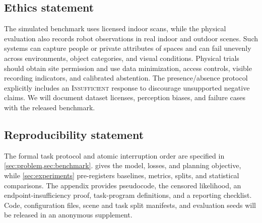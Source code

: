 \documentclass{article}
\begin{document}
\subsection*{Ethics statement}
The simulated benchmark uses licensed indoor scans, while the physical evaluation also records robot observations in real indoor and outdoor scenes.
Such systems can capture people or private attributes of spaces and can fail unevenly across environments, object categories, and visual conditions.
Physical trials should obtain site permission and use data minimization, access controls, visible recording indicators, and calibrated abstention.
The presence/absence protocol explicitly includes an \textsc{Insufficient} response to discourage unsupported negative claims.
We will document dataset licenses, perception biases, and failure cases with the released benchmark.

\subsection*{Reproducibility statement}
The formal task protocol and atomic interruption order are specified in \cref{sec:problem,sec:benchmark}.
 gives the model, losses, and planning objective, while \cref{sec:experiments} pre-registers baselines, metrics, splits, and statistical comparisons.
The appendix provides pseudocode, the censored likelihood, an endpoint-insufficiency proof, task-program definitions, and a reporting checklist.
Code, configuration files, scene and task split manifests, and evaluation seeds will be released in an anonymous supplement.




\appendix

\end{document}
